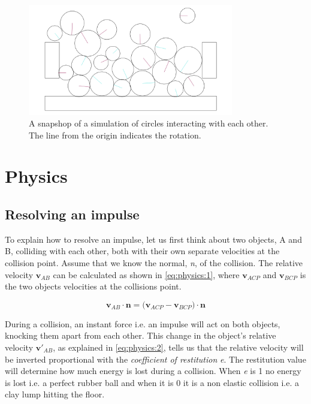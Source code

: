 \documentclass[a4paper,12pt]{report}
\begin{document}
\begin{figure}[!ht]
    \centering
    \includegraphics[width=0.8\textwidth]{figures/snapshot.png}
    \caption{A snapshop of a simulation of circles interacting with each other. The line from the origin indicates the rotation.}
    \label{fig:snapshot}
\end{figure}


\chapter{Physics}

\section{Resolving an impulse}

To explain how to resolve an impulse\cite{gdm}, let us first think about two objects, A and B, colliding with each other, both with their own separate velocities at the collision point. Assume that we know the normal, \emph{n}, of the collision. The relative velocity $\mathbf v_{AB}$ can be calculated as shown in \ref{eq:physics:1}, where $\mathbf v_{ACP}$ and $\mathbf v_{BCP}$ is the two objects velocities at the collisions point.

\begin{equation}
\mathbf v_{AB}\cdot \mathbf n=\mathbf (\mathbf v_{ACP} - \mathbf v_{BCP})\cdot \mathbf n
\label{eq:physics:1}
\end{equation}

During a collision, an instant force i.e. an impulse will act on both objects, knocking them apart from each other. This change in the object’s relative velocity $\mathbf v'_{AB}$, as explained in \ref{eq:physics:2}, tells us that the relative velocity will be inverted proportional with the \emph{coefficient of restitution} \emph{e}. The restitution value will determine how much energy is lost during a collision. When \emph{e} is 1 no energy is lost i.e. a perfect rubber ball and when it is 0 it is a non elastic collision i.e. a clay lump hitting the floor.
\end{document}

